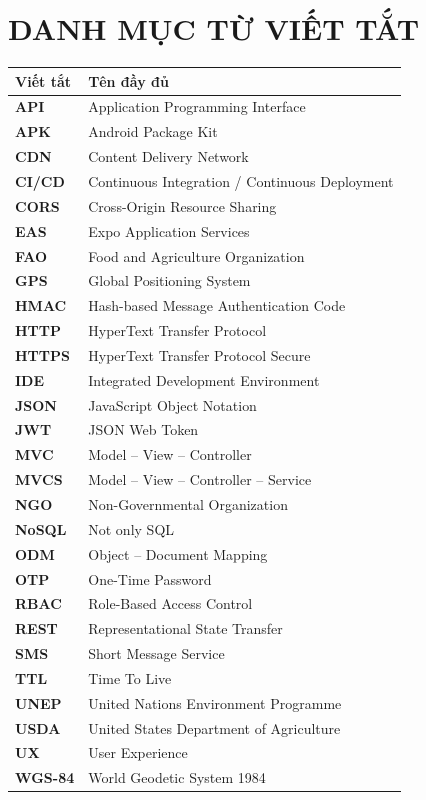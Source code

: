 \documentclass[../main.tex]{subfiles}
\begin{document}
\chapter*{DANH MỤC TỪ VIẾT TẮT}
\begin{longtable}{p{}p{}}
\hline
\textbf{Viết tắt} & \textbf{Tên đầy đủ} \\ \hline
\endhead
\textbf{API}    & Application Programming Interface \\
\textbf{APK}    & Android Package Kit \\
\textbf{CDN}    & Content Delivery Network \\
\textbf{CI/CD}  & Continuous Integration / Continuous Deployment \\
\textbf{CORS}   & Cross-Origin Resource Sharing \\
\textbf{EAS}    & Expo Application Services \\
\textbf{FAO}    & Food and Agriculture Organization \\
\textbf{GPS}    & Global Positioning System \\
\textbf{HMAC}   & Hash-based Message Authentication Code \\
\textbf{HTTP}   & HyperText Transfer Protocol \\
\textbf{HTTPS}  & HyperText Transfer Protocol Secure \\
\textbf{IDE}    & Integrated Development Environment \\
\textbf{JSON}   & JavaScript Object Notation \\
\textbf{JWT}    & JSON Web Token \\
\textbf{MVC}    & Model -- View -- Controller \\
\textbf{MVCS}   & Model -- View -- Controller -- Service \\
\textbf{NGO}    & Non-Governmental Organization \\
\textbf{NoSQL}  & Not only SQL \\
\textbf{ODM}    & Object -- Document Mapping \\
\textbf{OTP}    & One-Time Password \\
\textbf{RBAC}   & Role-Based Access Control \\
\textbf{REST}   & Representational State Transfer \\
\textbf{SMS}    & Short Message Service \\
\textbf{TTL}    & Time To Live \\
\textbf{UNEP}   & United Nations Environment Programme \\
\textbf{USDA}   & United States Department of Agriculture \\
\textbf{UX}     & User Experience \\
\textbf{WGS-84} & World Geodetic System 1984 \\ \hline
\end{longtable}
\end{document}
